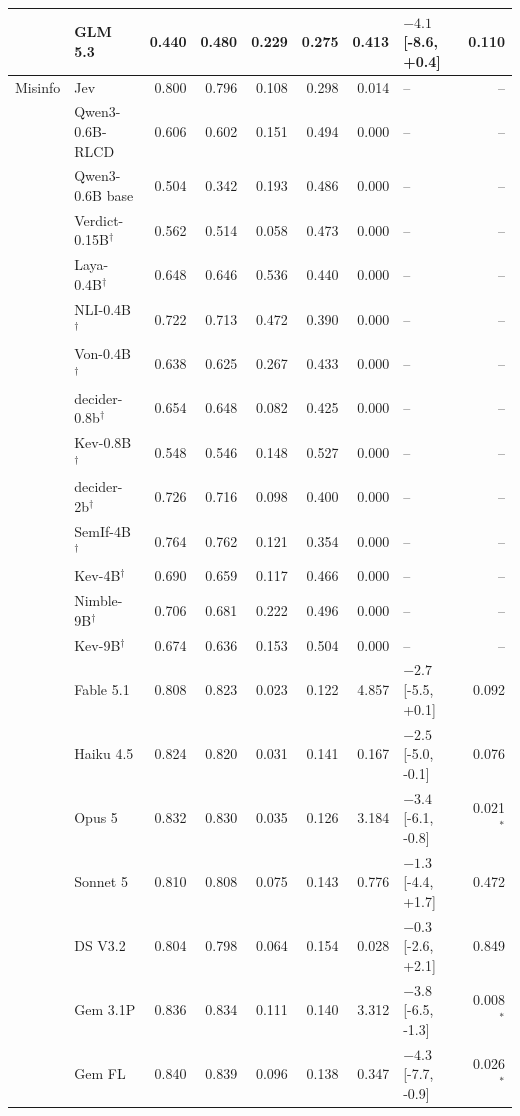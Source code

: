 \begin{longtable}{llrrrrrlr}
 & GLM 5.3 & 0.440 & 0.480 & 0.229 & 0.275 & 0.413 & $-4.1$ [-8.6, +0.4] & 0.110 \\
\midrule
Misinfo & Jev & 0.800 & 0.796 & 0.108 & 0.298 & 0.014 & -- & -- \\
 & Qwen3-0.6B-RLCD & 0.606 & 0.602 & 0.151 & 0.494 & 0.000 & -- & -- \\
 & Qwen3-0.6B base & 0.504 & 0.342 & 0.193 & 0.486 & 0.000 & -- & -- \\
 & Verdict-0.15B$^{\dagger}$ & 0.562 & 0.514 & 0.058 & 0.473 & 0.000 & -- & -- \\
 & Laya-0.4B$^{\dagger}$ & 0.648 & 0.646 & 0.536 & 0.440 & 0.000 & -- & -- \\
 & NLI-0.4B$^{\dagger}$ & 0.722 & 0.713 & 0.472 & 0.390 & 0.000 & -- & -- \\
 & Von-0.4B$^{\dagger}$ & 0.638 & 0.625 & 0.267 & 0.433 & 0.000 & -- & -- \\
 & decider-0.8b$^{\dagger}$ & 0.654 & 0.648 & 0.082 & 0.425 & 0.000 & -- & -- \\
 & Kev-0.8B$^{\dagger}$ & 0.548 & 0.546 & 0.148 & 0.527 & 0.000 & -- & -- \\
 & decider-2b$^{\dagger}$ & 0.726 & 0.716 & 0.098 & 0.400 & 0.000 & -- & -- \\
 & SemIf-4B$^{\dagger}$ & 0.764 & 0.762 & 0.121 & 0.354 & 0.000 & -- & -- \\
 & Kev-4B$^{\dagger}$ & 0.690 & 0.659 & 0.117 & 0.466 & 0.000 & -- & -- \\
 & Nimble-9B$^{\dagger}$ & 0.706 & 0.681 & 0.222 & 0.496 & 0.000 & -- & -- \\
 & Kev-9B$^{\dagger}$ & 0.674 & 0.636 & 0.153 & 0.504 & 0.000 & -- & -- \\
 & Fable 5.1 & 0.808 & 0.823 & 0.023 & 0.122 & 4.857 & $-2.7$ [-5.5, +0.1] & 0.092 \\
 & Haiku 4.5 & 0.824 & 0.820 & 0.031 & 0.141 & 0.167 & $-2.5$ [-5.0, -0.1] & 0.076 \\
 & Opus 5 & 0.832 & 0.830 & 0.035 & 0.126 & 3.184 & $-3.4$ [-6.1, -0.8] & 0.021$^{*}$ \\
 & Sonnet 5 & 0.810 & 0.808 & 0.075 & 0.143 & 0.776 & $-1.3$ [-4.4, +1.7] & 0.472 \\
 & DS V3.2 & 0.804 & 0.798 & 0.064 & 0.154 & 0.028 & $-0.3$ [-2.6, +2.1] & 0.849 \\
 & Gem 3.1P & 0.836 & 0.834 & 0.111 & 0.140 & 3.312 & $-3.8$ [-6.5, -1.3] & 0.008$^{*}$ \\
 & Gem FL & 0.840 & 0.839 & 0.096 & 0.138 & 0.347 & $-4.3$ [-7.7, -0.9] & 0.026$^{*}$ \\

\end{longtable}
